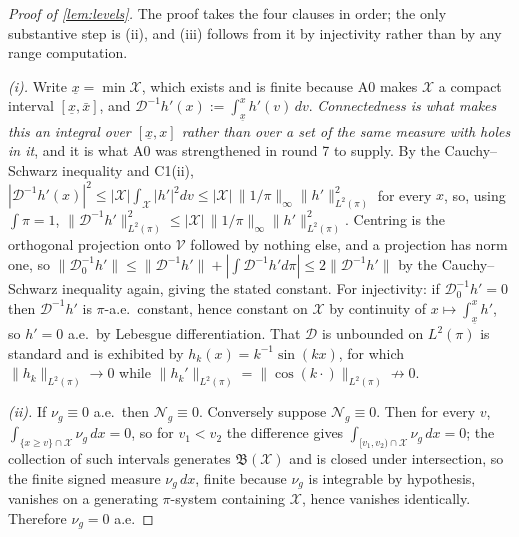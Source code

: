\begin{proof}[Proof of \cref{lem:levels}]
The proof takes the four clauses in order; the only substantive step is (ii), and (iii) follows from it
by injectivity rather than by any range computation.

\emph{(i).} Write $\underline x=\min\mathcal X$, which exists and is finite because A0 makes $\mathcal X$
a compact interval $[\underline x,\bar x]$, and
$\mathcal D^{-1}h'(x):=\int_{\underline x}^{x}h'(v)\,dv$. \emph{Connectedness is what makes this an
integral over $[\underline x,x]$ rather than over a set of the same measure with holes in it}, and it is
what A0 was strengthened in round 7 to supply. By the Cauchy--Schwarz inequality and C1(ii),
$|\mathcal D^{-1}h'(x)|^{2}\le|\mathcal X|\int_{\mathcal X}|h'|^{2}dv\le|\mathcal X|\,\|1/\pi\|_\infty\|h'\|^{2}_{L^{2}(\pi)}$
for every $x$, so, using $\int\pi=1$,
$\|\mathcal D^{-1}h'\|^{2}_{L^{2}(\pi)}\le|\mathcal X|\,\|1/\pi\|_\infty\|h'\|^{2}_{L^{2}(\pi)}$. Centring
is the orthogonal projection onto $\mathcal V$ followed by nothing else, and a projection has norm one,
so $\|\mathcal D^{-1}_0h'\|\le\|\mathcal D^{-1}h'\|+|\!\int\mathcal D^{-1}h'd\pi|\le2\|\mathcal D^{-1}h'\|$
by the Cauchy--Schwarz inequality again, giving the stated constant. For injectivity: if
$\mathcal D^{-1}_0h'=0$ then $\mathcal D^{-1}h'$ is $\pi$-a.e.\ constant, hence constant on $\mathcal X$
by continuity of $x\mapsto\int_{\underline x}^{x}h'$, so $h'=0$ a.e.\ by Lebesgue differentiation. That
$\mathcal D$ is unbounded on $L^{2}(\pi)$ is standard and is exhibited by $h_k(x)=k^{-1}\sin(kx)$, for
which $\|h_k\|_{L^{2}(\pi)}\to0$ while $\|h_k'\|_{L^{2}(\pi)}=\|\cos(k\cdot)\|_{L^{2}(\pi)}\not\to0$.

\emph{(ii).} If $\nu_g\equiv0$ a.e.\ then $\mathcal N_g\equiv0$. Conversely suppose $\mathcal N_g\equiv0$.
Then for every $v$, $\int_{\{x\ge v\}\cap\mathcal X}\nu_g\,dx=0$, so for $v_1<v_2$ the difference gives
$\int_{[v_1,v_2)\cap\mathcal X}\nu_g\,dx=0$; the collection of such intervals generates
$\mathfrak B(\mathcal X)$ and is closed under intersection, so the finite signed measure $\nu_g\,dx$, finite
because $\nu_g$ is integrable by hypothesis, vanishes on a generating $\pi$-system containing
$\mathcal X$, hence vanishes identically. Therefore $\nu_g=0$ a.e.


\end{proof}
